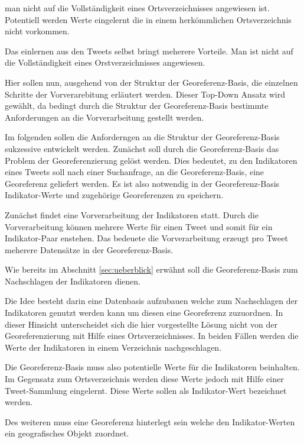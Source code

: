 				man nicht auf die Vollständigkeit eines Ortsverzeichnisses angewiesen ist.
				Potentiell werden Werte eingelernt die in einem herkömmlichen Ortsverzeichnis nicht vorkommen.   

				Das einlernen aus den Tweets selbst bringt meherere Vorteile. 
				Man ist nicht auf die Vollständigkeit eines Orstverzeichnisses angewiesen.
				
 
				Hier sollen nun, ausgehend von der Struktur der Georeferenz-Basis, die einzelnen Schritte der Vorverarebitung erläutert werden. 
				Dieser Top-Down Ansatz wird gewählt, da bedingt durch die Struktur der Georeferenz-Basis bestimmte Anforderungen an die Vorverarbeitung gestellt werden.

				Im folgenden sollen die Anforderngen an die Struktur der Georeferenz-Basis sukzessive entwickelt werden.
				Zunächst soll durch die Georeferenz-Basis das Problem der Georeferenzierung gelöst werden. 
				Dies bedeutet, zu den Indikatoren eines Tweets soll nach einer Suchanfrage, an die Georeferenz-Basis, eine Georeferenz geliefert werden.
				Es ist also notwendig in der Georeferenz-Basis Indikator-Werte und zugehörige Georeferenzen zu speichern.



				
				  

				Zunächst findet eine Vorverarbeitung der Indikatoren statt. 
				Durch die Vorverarbeitung können mehrere Werte für einen Tweet und somit für ein Indikator-Paar enstehen. 
				Das bedeuete die Vorverarbeitung erzeugt pro Tweet meherere Datensätze in der Georeferenz-Basis.

				Wie bereits im Abschnitt \ref{sec:ueberblick} erwähnt soll die Georeferenz-Basis zum Nachschlagen der Indikatoren dienen.  

				Die Idee besteht darin eine Datenbasis aufzubauen welche zum Nachschlagen der Indikatoren genutzt werden kann um diesen eine Georeferenz zuzuordnen.
				In dieser Hinsicht unterscheidet sich die hier vorgestellte Lösung nicht von der Georeferenzierung mit Hilfe eines Ortsverzeichnisses.
				In beiden Fällen werden die Werte der Indikatoren in einem Verzeichnis nachgeschlagen. 
				
				Die Georeferenz-Basis muss also potentielle Werte für die Indikatoren beinhalten.
				Im Gegensatz zum Ortsverzeichnis werden diese Werte jedoch mit Hilfe einer Tweet-Sammlung eingelernt.
				Diese Werte sollen als Indikator-Wert bezeichnet werden.

				Des weiteren muss eine Georeferenz hinterlegt sein welche den Indikator-Werten ein geografisches Objekt zuordnet.

